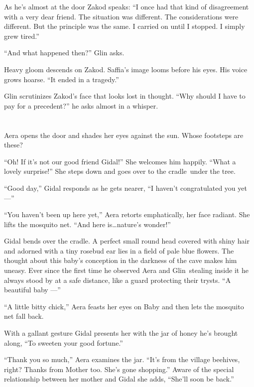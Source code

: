\documentclass[twoside,11pt]{book}
\begin{document}
As he's almost at the door Zakod speaks: ``I once had that kind of disagreement with a very dear friend.
The situation was different. The considerations were different. But the principle was the same. I carried on until I
stopped. I simply{ }grew tired.''

``And what happened then?'' Glin asks.

Heavy gloom descends on Zakod.  Saffia's image looms before his eyes. His voice grows hoarse. ``It ended
in a tragedy.''

Glin scrutinizes Zakod's face that looks lost in thought. ``Why
should{ }I have to pay for a precedent?'' he asks almost in a
whisper.



\chapter{}

Aera opens the door and shades her eyes against the sun. Whose footsteps are these?

``Oh! If it's not our good friend Gidal!'' She welcomes him happily. ``What a
lovely surprise!'' She steps down and goes over to the
cradle~under{ }the tree.

``Good day,'' Gidal responds as he gets nearer, ``I haven't congratulated you yet
---''

``You haven't been up here yet,'' Aera retorts emphatically, her face radiant. She lifts the
mosquito net. ``And here is{\ldots}nature's wonder!''

Gidal bends over the cradle. A perfect small round head covered with shiny hair and adorned with a tiny rosebud ear lies
in a field of pale blue flowers. The thought about this baby's conception in the darkness of the cave makes him
uneasy. Ever since the first time he observed Aera and Glin~stealing inside it he always stood by at a safe distance,
like a guard protecting their trysts. ``A beautiful baby ---''

``A little bitty chick,'' Aera feasts her eyes on Baby and then lets the mosquito net fall
back.

With a gallant gesture Gidal presents her with the jar of honey he's brought along, ``To sweeten your good
fortune.''

``Thank you so much,'' Aera examines the jar. ``It's from the village beehives,
right? Thanks from Mother too. She's gone shopping.'' Aware of the special relationship between her mother
and Gidal she adds, ``She'll soon be back.''
\end{document}
